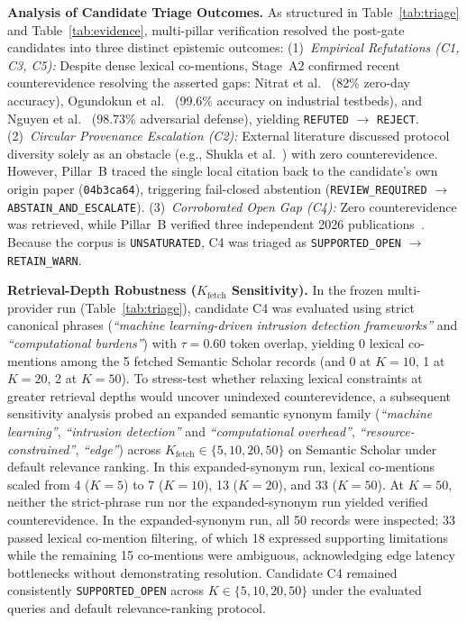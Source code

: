 \documentclass[runningheads]{llncs}
\begin{document}
\noindent\textbf{Analysis of Candidate Triage Outcomes.} As structured in Table~\ref{tab:triage} and Table~\ref{tab:evidence}, multi-pillar verification resolved the post-gate candidates into three distinct epistemic outcomes:
(1)~\emph{Empirical Refutations (C1, C3, C5):} Despite dense lexical co-mentions, Stage~A2 confirmed recent counterevidence resolving the asserted gaps: Nitrat et al.~\cite{nitrat2025zeroday} (82\% zero-day accuracy), Ogundokun et al.~\cite{ogundokun2025litert} (99.6\% accuracy on industrial testbeds), and Nguyen et al.~\cite{nguyen2025adversarial} (98.73\% adversarial defense), yielding \texttt{REFUTED} $\rightarrow$ \texttt{REJECT}.
(2)~\emph{Circular Provenance Escalation (C2):} External literature discussed protocol diversity solely as an obstacle (e.g., Shukla et al.~\cite{shukla2025effective}) with zero counterevidence. However, Pillar~B traced the single local citation back to the candidate's own origin paper (\texttt{04b3ca64}), triggering fail-closed abstention (\texttt{REVIEW\_REQUIRED} $\rightarrow$ \texttt{ABSTAIN\_AND\_ESCALATE}).
(3)~\emph{Corroborated Open Gap (C4):} Zero counterevidence was retrieved, while Pillar~B verified three independent 2026 publications~\cite{jenish2026review,alam2026reservoir,mahdi2026scf}. Because the corpus is \texttt{UNSATURATED}, C4 was triaged as \texttt{SUPPORTED\_OPEN} $\rightarrow$ \texttt{RETAIN\_WARN}.

\noindent\textbf{Retrieval-Depth Robustness ($K_{\text{fetch}}$ Sensitivity).} In the frozen multi-provider run (Table~\ref{tab:triage}), candidate C4 was evaluated using strict canonical phrases (\emph{``machine learning-driven intrusion detection frameworks''} and \emph{``computational burdens''}) with $\tau=0.60$ token overlap, yielding 0 lexical co-mentions among the 5 fetched Semantic Scholar records (and 0 at $K=10$, 1 at $K=20$, 2 at $K=50$). To stress-test whether relaxing lexical constraints at greater retrieval depths would uncover unindexed counterevidence, a subsequent sensitivity analysis probed an expanded semantic synonym family (\emph{``machine learning''}, \emph{``intrusion detection''} and \emph{``computational overhead''}, \emph{``resource-constrained''}, \emph{``edge''}) across $K_{\text{fetch}} \in \{5, 10, 20, 50\}$ on Semantic Scholar under default relevance ranking. In this expanded-synonym run, lexical co-mentions scaled from 4 ($K=5$) to 7 ($K=10$), 13 ($K=20$), and 33 ($K=50$). At $K = 50$, neither the strict-phrase run nor the expanded-synonym run yielded verified counterevidence. In the expanded-synonym run, all 50 records were inspected; 33 passed lexical co-mention filtering, of which 18 expressed supporting limitations while the remaining 15 co-mentions were ambiguous, acknowledging edge latency bottlenecks without demonstrating resolution. Candidate C4 remained consistently \texttt{SUPPORTED\_OPEN} across $K \in \{5, 10, 20, 50\}$ under the evaluated queries and default relevance-ranking protocol.
\end{document}
